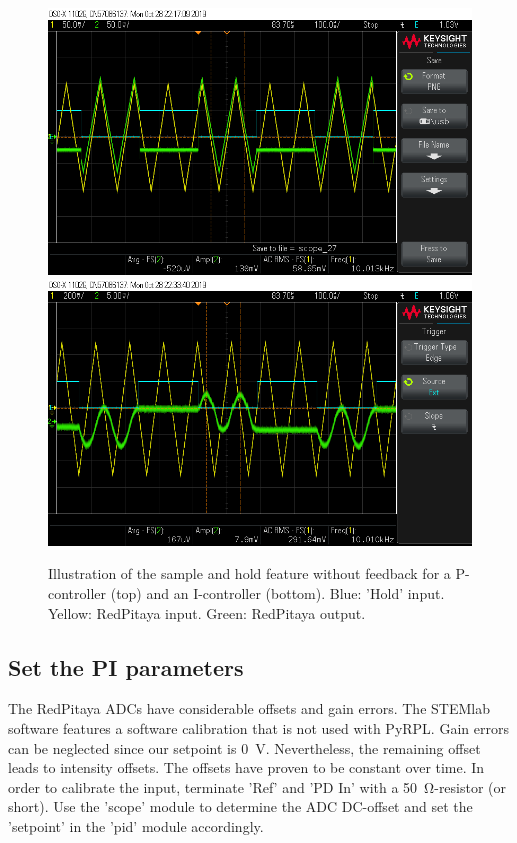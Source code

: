 \documentclass[twoside,a4paper]{refart}
\begin{document}
\begin{figure}[H]
	\includegraphics[width=\textwidth]{fig/sample_and_hold_P.png}\\
	\includegraphics[width=\textwidth]{fig/sample_and_hold_I.png}
	\caption{Illustration of the sample and hold feature without feedback for a P-controller (top) and an I-controller (bottom). Blue: 'Hold' input. Yellow: RedPitaya input. Green: RedPitaya output. \label{fig:sample_and_hold}}
\end{figure}


\subsection{Set the PI parameters}

The RedPitaya ADCs have considerable offsets and gain errors. The STEMlab software features a software calibration that is not used with PyRPL. Gain errors can be neglected since our setpoint is \SI{0}{\volt}. Nevertheless, the remaining offset leads to intensity offsets. The offsets have proven to be constant over time. In order to calibrate the input, terminate 'Ref' and 'PD In' with a \SI{50}{\ohm}-resistor (or short). Use the 'scope' module to determine the ADC DC-offset and set the 'setpoint' in the 'pid' module accordingly.
\end{document}
